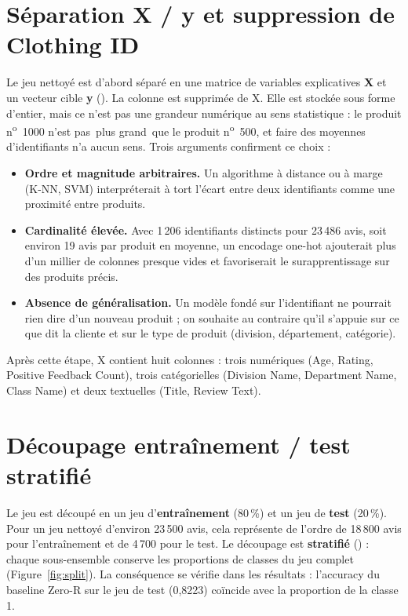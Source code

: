\documentclass[11pt,a4paper]{report}
\makeatletter
\def\og{\guillemotleft\nobreak\,}%
\def\fg{\unskip\nobreak\,\guillemotright}%
\newcommand{\gl}[1]{\og #1\fg{}}       %
\numberwithin{equation}{chapter}
\DeclareRobustCommand{\code}[1]{{\ttfamily\fontsize{\strip@pt\dimexpr\f@size pt*9/10\relax}{\f@baselineskip}\selectfont\detokenize{#1}}}
\makeatother
\begin{document}
\section{Séparation X / y et suppression de Clothing ID}\label{sec:clothingid}
Le jeu nettoyé est d'abord séparé en une matrice de variables explicatives \textbf{X} et un vecteur cible \textbf{y} (\code{Recommended IND}). La colonne \code{Clothing ID} est supprimée de X. Elle est stockée sous forme d'entier, mais ce n'est pas une grandeur numérique au sens statistique : le produit n\textsuperscript{o}~1000 n'est pas \gl{plus grand} que le produit n\textsuperscript{o}~500, et faire des moyennes d'identifiants n'a aucun sens. Trois arguments confirment ce choix :
\begin{itemize}
\item \textbf{Ordre et magnitude arbitraires.} Un algorithme à distance ou à marge (K-NN, SVM) interpréterait à tort l'écart entre deux identifiants comme une proximité entre produits.
\item \textbf{Cardinalité élevée.} Avec 1\,206 identifiants distincts pour 23\,486 avis, soit environ 19 avis par produit en moyenne, un encodage one-hot ajouterait plus d'un millier de colonnes presque vides et favoriserait le surapprentissage sur des produits précis.
\item \textbf{Absence de généralisation.} Un modèle fondé sur l'identifiant ne pourrait rien dire d'un nouveau produit ; on souhaite au contraire qu'il s'appuie sur ce que dit la cliente et sur le type de produit (division, département, catégorie).
\end{itemize}
Après cette étape, X contient huit colonnes : trois numériques (Age, Rating, Positive Feedback Count), trois catégorielles (Division Name, Department Name, Class Name) et deux textuelles (Title, Review Text).

\section{Découpage entraînement / test stratifié}
Le jeu est découpé en un jeu d'\textbf{entraînement} (80\,\%) et un jeu de \textbf{test} (20\,\%). Pour un jeu nettoyé d'environ 23\,500 avis, cela représente de l'ordre de 18\,800 avis pour l'entraînement et de 4\,700 pour le test. Le découpage est \textbf{stratifié} (\code{stratify=y}) : chaque sous-ensemble conserve les proportions de classes du jeu complet (Figure~\ref{fig:split}). La conséquence se vérifie dans les résultats : l'accuracy du baseline Zero-R sur le jeu de test (0,8223) coïncide avec la proportion de la classe 1.
\end{document}
